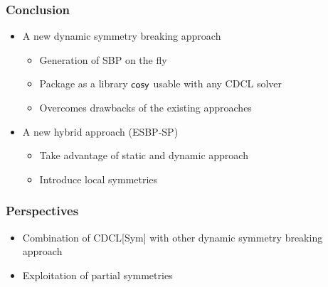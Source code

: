 \documentclass{beamer}
\begin{document}
\begin{frame}
\frametitle{Conclusion}
\begin{itemize}
	\item A new dynamic symmetry breaking approach 
	\begin{itemize}
		\item Generation of SBP on the fly
		\item Package as a library $\textsf{cosy}$ usable with any CDCL solver
		\item Overcomes drawbacks of the existing approaches
	\end{itemize}

\vfill
	\item A new hybrid approach (ESBP-SP)
	
	\begin{itemize}
		\item Take advantage of static and dynamic approach
		\item Introduce local symmetries
	\end{itemize}	
\end{itemize}	

\end{frame}
\begin{frame}
\frametitle{Perspectives}
\begin{itemize}
	\item Combination of CDCL[Sym] with other dynamic symmetry breaking approach

	\vfill
	\item Exploitation of partial symmetries
	

		
\end{itemize}	

\vfill
\flushright
{}
\end{frame}
\end{document}
